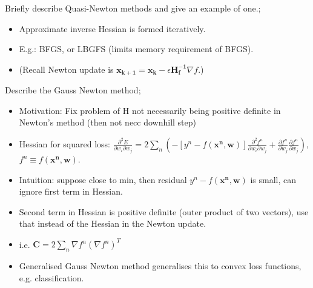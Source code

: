 \documentclass{article}
\begin{document}
Briefly describe Quasi-Newton methods and give an example of one.; \begin{itemize} \item Approximate inverse Hessian is formed iteratively.  \item E.g.: BFGS, or LBGFS (limits memory requirement of BFGS).  \item (Recall Newton update is $\mathbf{x_{k+1} = x_k} - \epsilon\mathbf{H^{-1}_f}\nabla f$.) \end{itemize}

Describe the Gauss Newton method; \begin{itemize} \item Motivation: Fix problem of H not necessarily being positive definite in Newton's method (then not necc downhill step) \item Hessian for squared loss: $\frac{\partial^2 E}{\partial w_i \partial w_j}=2\sum_n (-[y^n-f(\mathbf{x^n, w})]\frac{\partial ^2 f^n}{\partial w_i \partial w_j}+\frac{\partial f^n}{\partial w_j}\frac{\partial f^n}{\partial w_j})$, $f^n\equiv f(\mathbf{x^n, w})$.  \item Intuition: suppose close to min, then residual $y^n-f(\mathbf{x^n,w})$ is small, can ignore first term in Hessian.  \item Second term in Hessian is positive definite (outer product of two vectors), use that instead of the Hessian in the Newton update.  \item i.e. $\mathbf{C}=2\sum_n\nabla f^n(\nabla f^n)^T$ \item Generalised Gauss Newton method generalises this to convex loss functions, e.g. classification.  \end{itemize} 
            
\end{document}
